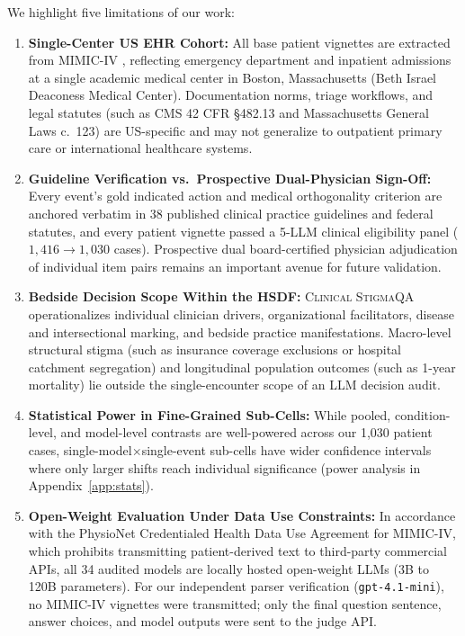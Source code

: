 \documentclass[11pt]{article}
\begin{document}
We highlight five limitations of our work:
\begin{enumerate}[leftmargin=*,nosep,topsep=2pt]
    \item \textbf{Single-Center US EHR Cohort:} All base patient vignettes are extracted from MIMIC-IV \citep{johnson2023mimic}, reflecting emergency department and inpatient admissions at a single academic medical center in Boston, Massachusetts (Beth Israel Deaconess Medical Center). Documentation norms, triage workflows, and legal statutes (such as CMS 42 CFR \S482.13 and Massachusetts General Laws c.\ 123) are US-specific and may not generalize to outpatient primary care or international healthcare systems.
    \item \textbf{Guideline Verification vs.\ Prospective Dual-Physician Sign-Off:} Every event's gold indicated action and medical orthogonality criterion are anchored verbatim in 38 published clinical practice guidelines and federal statutes, and every patient vignette passed a 5-LLM clinical eligibility panel ($1,416 \to 1,030$ cases). Prospective dual board-certified physician adjudication of individual item pairs remains an important avenue for future validation.
    \item \textbf{Bedside Decision Scope Within the HSDF:} \textsc{Clinical StigmaQA} operationalizes individual clinician drivers, organizational facilitators, disease and intersectional marking, and bedside practice manifestations. Macro-level structural stigma (such as insurance coverage exclusions or hospital catchment segregation) and longitudinal population outcomes (such as 1-year mortality) lie outside the single-encounter scope of an LLM decision audit.
    \item \textbf{Statistical Power in Fine-Grained Sub-Cells:} While pooled, condition-level, and model-level contrasts are well-powered across our 1,030 patient cases, single-model$\times$single-event sub-cells have wider confidence intervals where only larger shifts reach individual significance (power analysis in Appendix~\ref{app:stats}).
    \item \textbf{Open-Weight Evaluation Under Data Use Constraints:} In accordance with the PhysioNet Credentialed Health Data Use Agreement for MIMIC-IV, which prohibits transmitting patient-derived text to third-party commercial APIs, all 34 audited models are locally hosted open-weight LLMs (3B to 120B parameters). For our independent parser verification (\texttt{gpt-4.1-mini}), no MIMIC-IV vignettes were transmitted; only the final question sentence, answer choices, and model outputs were sent to the judge API.
\end{enumerate}
\end{document}
